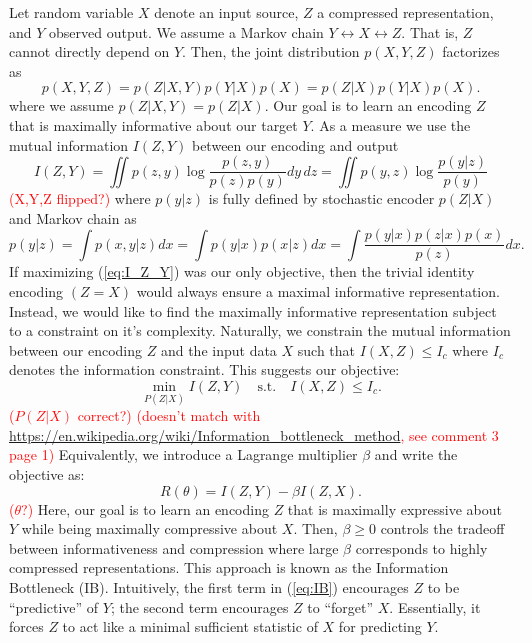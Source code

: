 \documentclass[11pt]{article}
\newcommand\myworries[1]{\textcolor{red}{(#1)}}
\begin{document}
Let random variable $X$ denote an input source, $Z$ a compressed representation, and $Y$ observed output. We assume a Markov chain $Y \leftrightarrow X \leftrightarrow Z$. That is, $Z$ cannot directly depend on $Y$. Then, the joint distribution $p(X,Y,Z)$ factorizes as
\begin{equation}
p(X, Y, Z) = p(Z\vert X,Y)p(Y\vert X)p(X) = p(Z\vert X)p(Y\vert X)p(X).
\end{equation}
where we assume $p(Z\vert X,Y) = p(Z\vert X)$.
Our goal is to learn an encoding $Z$ that is maximally informative about our target $Y$. As a measure we use the mutual information $I(Z,Y)$ between our encoding and output
\begin{equation}
I(Z,Y) = \iint p(z,y) \log \frac{p(z,y)}{p(z)p(y)} dy\, dz = \iint p(y,z) \log \frac{p(y\vert z)}{p(y)}
\label{eq:I_Z_Y}
\end{equation}
\myworries{X,Y,Z flipped?}
where  $p(y\vert z)$ is fully defined by stochastic encoder $p(Z\vert X)$ and Markov chain as
\begin{equation}
p(y\vert z) = \int p(x,y\vert z) dx = \int p(y \vert x) p(x \vert z) dx = \int \frac{p(y \vert x)p(z \vert x) p(x)}{p(z)}dx.
\label{eq:p_y_z}
\end{equation}
If maximizing (\ref{eq:I_Z_Y}) was our only objective, then the trivial identity encoding $(Z = X)$ would always ensure a maximal informative representation. Instead, we would like to find the maximally informative representation subject to a constraint on it's complexity. Naturally, we constrain the mutual information between our encoding $Z$ and the input data $X$ such that $I(X,Z) \leq I_c$ where $I_c$ denotes the information constraint. This suggests our objective:
\begin{equation}
\underset{P(Z\vert X)}{\min} I(Z,Y) \quad\text{s.t.}\quad I(X,Z) \leq I_c.
\end{equation}
\myworries{$P(Z\vert X)$ correct?}
\myworries{doesn't match with \url{https://en.wikipedia.org/wiki/Information_bottleneck_method}, see comment 3 page 1}
Equivalently, we introduce a Lagrange multiplier $\beta$ and write the objective as:
\begin{equation}
R(\theta) = I(Z,Y) - \beta I(Z,X).
\label{eq:IB}
\end{equation}
\myworries{$\theta$?}
Here, our goal is to learn an encoding $Z$ that is maximally expressive about $Y$ while being maximally compressive about $X$. Then, $\beta\geq 0$ controls the tradeoff between informativeness and compression where large $\beta$ corresponds to highly compressed representations. This approach is known as the Information Bottleneck (IB). Intuitively, the first term in (\ref{eq:IB}) encourages $Z$ to be ``predictive'' of $Y$; the second term encourages $Z$ to ``forget'' $X$. Essentially, it forces $Z$ to act like a minimal sufficient statistic of $X$ for predicting $Y$.
\end{document}
